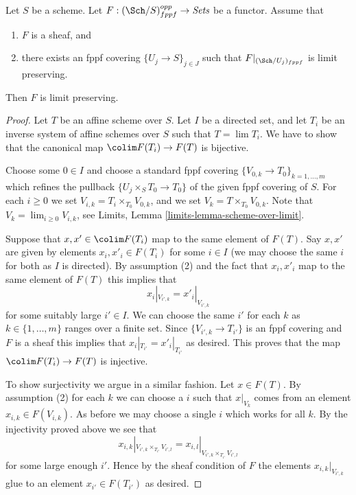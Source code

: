 \begin{lemma}
\label{lemma-sheaf-finite-presentation}
Let $S$ be a scheme.
Let $F : (\Sch/S)_{fppf}^{opp} \to \textit{Sets}$ be a functor.
Assume that
\begin{enumerate}
\item $F$ is a sheaf, and
\item there exists an fppf covering $\{U_j \to S\}_{j \in J}$ such that
$F|_{(\Sch/U_j)_{fppf}}$ is limit preserving.
\end{enumerate}
Then $F$ is limit preserving.
\end{lemma}

\begin{proof}
Let $T$ be an affine scheme over $S$.
Let $I$ be a directed set, and let
$T_i$ be an inverse system of affine schemes over $S$ such that
$T = \lim T_i$. We have to show that the canonical
map $\colim F(T_i) \to F(T)$ is bijective.

\medskip\noindent
Choose some $0 \in I$ and choose a standard fppf covering
$\{V_{0, k} \to T_{0}\}_{k = 1, \ldots, m}$ which refines
the pullback $\{U_j \times_S T_0 \to T_0\}$ of the given fppf covering of $S$.
For each $i \geq 0$ we set $V_{i, k} = T_i \times_{T_0} V_{0, k}$, and
we set $V_k = T \times_{T_0} V_{0, k}$. Note that
$V_k = \lim_{i \geq 0} V_{i, k}$, see
Limits, Lemma \ref{limits-lemma-scheme-over-limit}.

\medskip\noindent
Suppose that $x, x' \in \colim F(T_i)$ map to the same
element of $F(T)$. Say $x, x'$ are given by elements $x_i, x'_i \in F(T_i)$
for some $i \in I$ (we may choose the same $i$ for both as $I$ is directed).
By assumption (2) and the fact that $x_i, x'_i$ map to the same element
of $F(T)$ this implies that
$$
x_i|_{V_{i', k}} = x'_i|_{V_{i', k}}
$$
for some suitably large $i' \in I$. We can choose the same $i'$ for each
$k$ as $k \in \{1, \ldots, m\}$ ranges over a finite set.
Since $\{V_{i', k} \to T_{i'}\}$
is an fppf covering and $F$ is a sheaf this implies that
$x_i|_{T_{i'}} = x'_i|_{T_{i'}}$ as desired. This proves that the map
$\colim F(T_i) \to F(T)$ is injective.

\medskip\noindent
To show surjectivity we argue in a similar fashion.
Let $x \in F(T)$. By assumption (2) for each $k$ we
can choose a $i$ such that $x|_{V_k}$ comes from an
element $x_{i, k} \in F(V_{i, k})$. As before we may choose a
single $i$ which works for all $k$. By the injectivity
proved above we see that
$$
x_{i, k}|_{V_{i', k} \times_{T_{i'}} V_{i', l}}
=
x_{i, l}|_{V_{i', k} \times_{T_{i'}} V_{i', l}}
$$
for some large enough $i'$. Hence by the sheaf condition of $F$
the elements $x_{i, k}|_{V_{i', k}}$ glue to an element $x_{i'} \in F(T_{i'})$
as desired.
\end{proof}

